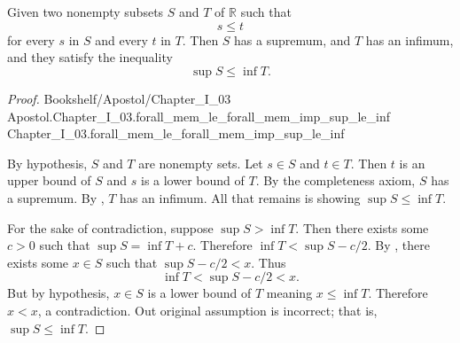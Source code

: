\documentclass{article}
\newcommand{\link}[1]{\lean{../..}
  {Bookshelf/Apostol/Chapter\_I\_03} %
  {Apostol.Chapter\_I\_03.#1} %
  {Chapter\_I\_03.#1} %
}
\begin{document}
\section*{}%
%

Given two nonempty subsets $S$ and $T$ of $\mathbb{R}$ such that $$s \leq t$$
  for every $s$ in $S$ and every $t$ in $T$. Then $S$ has a supremum, and $T$
  has an infimum, and they satisfy the inequality $$\sup{S} \leq \inf{T}.$$

\begin{proof}

  \link{forall\_mem\_le\_forall\_mem\_imp\_sup\_le\_inf}

  \divider

  By hypothesis, $S$ and $T$ are nonempty sets.
  Let $s \in S$ and $t \in T$.
  Then $t$ is an upper bound of $S$ and $s$ is a lower bound of $T$.
  By the completeness axiom, $S$ has a supremum.
  By , $T$ has an infimum.
  All that remains is showing $\sup{S} \leq \inf{T}$.

  For the sake of contradiction, suppose $\sup{S} > \inf{T}$.
  Then there exists some $c > 0$ such that $\sup{S} = \inf{T} + c$.
  Therefore $\inf{T} < \sup{S} - c / 2$.
  By , there exists some $x \in S$ such that
    $\sup{S} - c / 2 < x$.
  Thus $$\inf{T} < \sup{S} - c / 2 < x.$$
  But by hypothesis, $x \in S$ is a lower bound of $T$ meaning $x \leq \inf{T}$.
  Therefore $x < x$, a contradiction.
  Out original assumption is incorrect; that is, $\sup{S} \leq \inf{T}$.

\end{proof}
\end{document}
